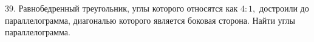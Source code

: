 39. Равнобедренный треугольник, углы которого относятся как $4:1,$ достроили до параллелограмма, диагональю которого является боковая сторона. Найти углы параллелограмма.\\
